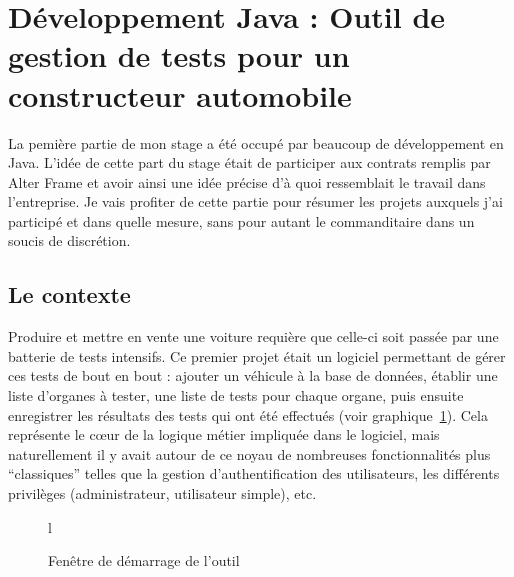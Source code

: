 \section{Développement Java : Outil de gestion de tests pour un constructeur automobile}
La pemière partie de mon stage a été occupé par beaucoup de développement en Java. L'idée de cette part du stage était de participer aux contrats remplis par Alter Frame et avoir ainsi une idée précise d'à quoi ressemblait le travail dans l'entreprise. Je vais profiter de cette partie pour résumer les projets auxquels j'ai participé et dans quelle mesure, sans pour autant le commanditaire dans un soucis de discrétion.

\subsection{Le contexte}
Produire et mettre en vente une voiture requière que celle-ci soit passée par une batterie de tests intensifs. Ce premier projet était un logiciel permettant de gérer ces tests de bout en bout : ajouter un véhicule à la base de données, établir une liste d'organes à tester, une liste de tests pour chaque organe, puis ensuite enregistrer les résultats des tests qui ont été effectués (voir graphique~\ref{fig:acceuil}). Cela représente le c\oe{}ur de la logique métier impliquée dans le logiciel, mais naturellement il y avait autour de ce noyau de nombreuses fonctionnalités plus ``classiques'' telles que la gestion d'authentification des utilisateurs, les différents privilèges (administrateur, utilisateur simple), etc.

\begin{figure}{l}
	\caption{Fenêtre de démarrage de l'outil}
	\label{fig:acceuil}
\end{figure}

